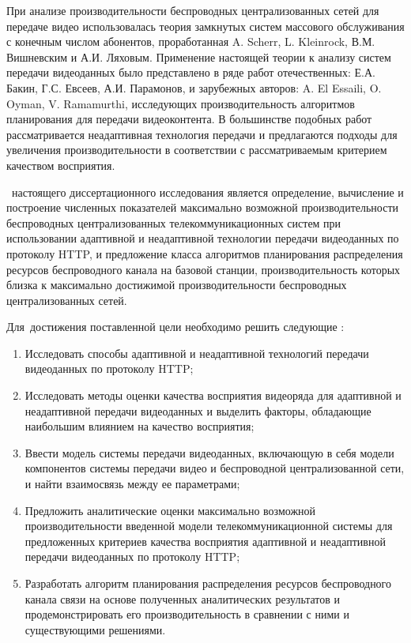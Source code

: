 При анализе производительности беспроводных централизованных сетей для передаче видео использовалась теория замкнутых систем массового обслуживания с конечным числом абонентов, проработанная A. Scherr, L. Kleinrock, В.М. Вишневским и А.И. Ляховым. Применение настоящей теории к анализу систем передачи видеоданных было представлено в ряде работ отечественных: Е.А. Бакин, Г.С. Евсеев, А.И. Парамонов, и зарубежных авторов: A. El Essaili, O. Oyman, V. Ramamurthi, исследующих производительность алгоритмов планирования для передачи видеоконтента. В большинстве подобных работ рассматривается неадаптивная технология передачи и предлагаются подходы для увеличения производительности в соответствии с рассматриваемым критерием качеством восприятия.

\aim\ настоящего диссертационного исследования является определение, вычисление и построение численных показателей максимально возможной производительности беспроводных централизованных телекоммуникационных систем при использовании адаптивной и неадаптивной технологии передачи видеоданных по протоколу HTTP, и предложение класса алгоритмов планирования распределения ресурсов беспроводного канала на базовой станции, производительность которых близка к максимально достижимой производительности беспроводных централизованных сетей.

Для~достижения поставленной цели необходимо решить следующие {\tasks}:
\begin{enumerate}
    \item Исследовать способы адаптивной и неадаптивной технологий передачи видеоданных по протоколу HTTP;
    \item Исследовать методы оценки качества восприятия видеоряда для адаптивной и неадаптивной передачи видеоданных и выделить факторы, обладающие наибольшим влиянием на качество восприятия;
    \item Ввести модель системы передачи видеоданных, включающую в себя модели компонентов системы передачи видео и беспроводной централизованной сети, и найти взаимосвязь между ее параметрами;
    \item Предложить аналитические оценки максимально возможной производительности введенной модели телекоммуникационной системы для предложенных критериев качества восприятия адаптивной и неадаптивной передачи видеоданных по протоколу HTTP;
    \item Разработать алгоритм планирования распределения ресурсов беспроводного канала связи на основе полученных аналитических результатов и продемонстрировать его производительность в сравнении с ними и существующими решениями.
\end{enumerate}

